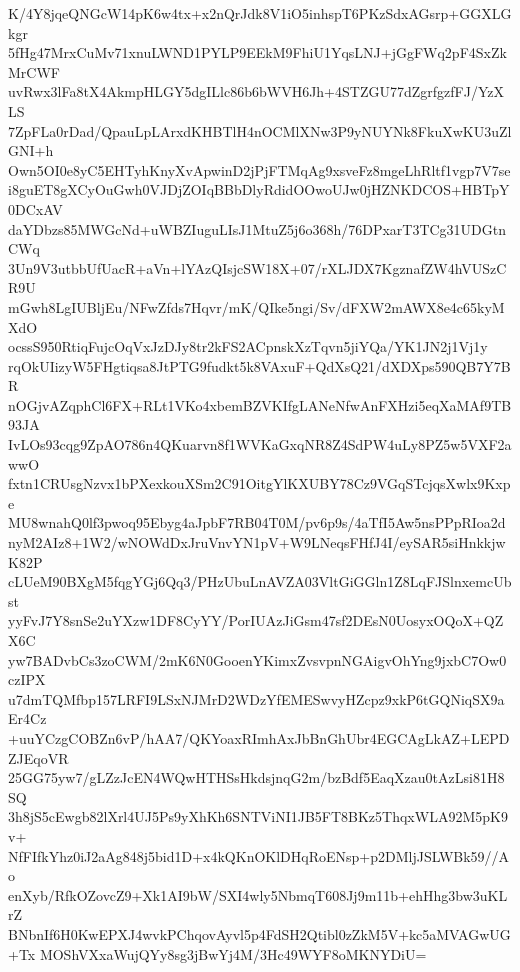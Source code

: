 K/4Y8jqeQNGcW14pK6w4tx+x2nQrJdk8V1iO5inhspT6PKzSdxAGsrp+GGXLGkgr
5fHg47MrxCuMv71xnuLWND1PYLP9EEkM9FhiU1YqsLNJ+jGgFWq2pF4SxZkMrCWF
uvRwx3lFa8tX4AkmpHLGY5dgILlc86b6bWVH6Jh+4STZGU77dZgrfgzfFJ/YzXLS
7ZpFLa0rDad/QpauLpLArxdKHBTlH4nOCMlXNw3P9yNUYNk8FkuXwKU3uZlGNI+h
Own5OI0e8yC5EHTyhKnyXvApwinD2jPjFTMqAg9xsveFz8mgeLhRltf1vgp7V7se
i8guET8gXCyOuGwh0VJDjZOIqBBbDlyRdidOOwoUJw0jHZNKDCOS+HBTpY0DCxAV
daYDbzs85MWGcNd+uWBZIuguLIsJ1MtuZ5j6o368h/76DPxarT3TCg31UDGtnCWq
3Un9V3utbbUfUacR+aVn+lYAzQIsjcSW18X+07/rXLJDX7KgznafZW4hVUSzCR9U
mGwh8LgIUBljEu/NFwZfds7Hqvr/mK/QIke5ngi/Sv/dFXW2mAWX8e4c65kyMXdO
ocssS950RtiqFujcOqVxJzDJy8tr2kFS2ACpnskXzTqvn5jiYQa/YK1JN2j1Vj1y
rqOkUIizyW5FHgtiqsa8JtPTG9fudkt5k8VAxuF+QdXsQ21/dXDXps590QB7Y7BR
nOGjvAZqphCl6FX+RLt1VKo4xbemBZVKIfgLANeNfwAnFXHzi5eqXaMAf9TB93JA
IvLOs93cqg9ZpAO786n4QKuarvn8f1WVKaGxqNR8Z4SdPW4uLy8PZ5w5VXF2awwO
fxtn1CRUsgNzvx1bPXexkouXSm2C91OitgYlKXUBY78Cz9VGqSTcjqsXwlx9Kxpe
MU8wnahQ0lf3pwoq95Ebyg4aJpbF7RB04T0M/pv6p9s/4aTfI5Aw5nsPPpRIoa2d
nyM2AIz8+1W2/wNOWdDxJruVnvYN1pV+W9LNeqsFHfJ4I/eySAR5siHnkkjwK82P
cLUeM90BXgM5fqgYGj6Qq3/PHzUbuLnAVZA03VltGiGGln1Z8LqFJSlnxemcUbst
yyFvJ7Y8snSe2uYXzw1DF8CyYY/PorIUAzJiGsm47sf2DEsN0UosyxOQoX+QZX6C
yw7BADvbCs3zoCWM/2mK6N0GooenYKimxZvsvpnNGAigvOhYng9jxbC7Ow0czIPX
u7dmTQMfbp157LRFI9LSxNJMrD2WDzYfEMESwvyHZcpz9xkP6tGQNiqSX9aEr4Cz
+uuYCzgCOBZn6vP/hAA7/QKYoaxRImhAxJbBnGhUbr4EGCAgLkAZ+LEPDZJEqoVR
25GG75yw7/gLZzJcEN4WQwHTHSsHkdsjnqG2m/bzBdf5EaqXzau0tAzLsi81H8SQ
3h8jS5cEwgb82lXrl4UJ5Ps9yXhKh6SNTViNI1JB5FT8BKz5ThqxWLA92M5pK9v+
NfFIfkYhz0iJ2aAg848j5bid1D+x4kQKnOKlDHqRoENsp+p2DMljJSLWBk59//Ao
enXyb/RfkOZovcZ9+Xk1AI9bW/SXI4wly5NbmqT608Jj9m11b+ehHhg3bw3uKLrZ
BNbnIf6H0KwEPXJ4wvkPChqovAyvl5p4FdSH2Qtibl0zZkM5V+kc5aMVAGwUG+Tx
MOShVXxaWujQYy8sg3jBwYj4M/3Hc49WYF8oMKNYDiU=
